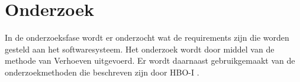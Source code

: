 \chapter{Onderzoek}
\label{chap:Onderzoek}
In de onderzoeksfase wordt er onderzocht wat de requirements zijn die worden gesteld aan het softwaresysteem.
Het onderzoek wordt door middel van de methode van Verhoeven \Parencite{Verhoeven} uitgevoerd.
Er wordt daarnaast gebruikgemaakt van de onderzoekmethoden die beschreven zijn door HBO-I \Parencite{HBO-i-reasearch-methods}.




% 
